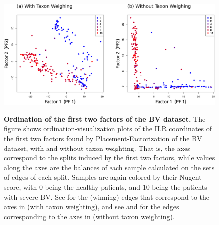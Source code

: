 \begin{figure}[!htb]
    \centering
     \includegraphics[width=\linewidth]{pdf/pf_bv_place_ilr_ordination.pdf}
    \begin{subfigure}{0pt}
        \label{fig:pf_bv_place_ilr_ordination:sub:with_taxon_weighting}
    \end{subfigure}
    \begin{subfigure}{0pt}
        \label{fig:pf_bv_place_ilr_ordination:sub:without_taxon_weighting}
    \end{subfigure}
    \caption[Ordination of the first two factors of the \ac{BV} dataset]{
        \textbf{Ordination of the first two factors of the \ac{BV} dataset.}
        The figure shows ordination-visualization plots of the ILR coordinates of the first two factors
        found by Placement-Factorization of the \ac{BV} dataset,
         with and
         without taxon weighting.
        That is, the axes correspond to the splits induced by the first two factors,
        while values along the axes are the balances of each sample calculated on the sets of edges of each split.
        Samples are again colored by their Nugent score, with \num{0} being the healthy patients,
        and \num{10} being the patients with severe \ac{BV}.
        See  for the (winning) edges that correspond to the axes
        in  (with taxon weighting),
        and see  and 
        for the edges corresponding to the axes in 
        (without taxon weighting).
    }
    \label{fig:pf_bv_place_ilr_ordination}
\end{figure}

